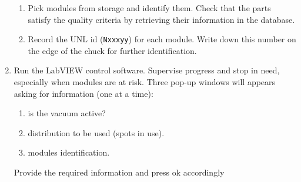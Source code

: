 \documentclass[12pt]{unlsilabsop}
\begin{document}
\begin{enumerate}
\begin{enumerate}
       \item Pick modules from storage and identify them. Check that the parts satisfy the quality criteria by retrieving their information in the database. \label{enum:startencapsulation}
    \item Record the UNL id (\texttt{Nxxxyy}) for each module. Write down this number on the edge of the chuck for further identification.
    \end{enumerate}
  \item Run the LabVIEW control software. Supervise progress and stop in need, especially when modules are at risk. Three pop-up windows will appears asking for information (one at a time):
    \begin{enumerate}
    \item is the vacuum active?
    \item distribution to be used (spots in use).  
    \item modules identification.  
    \end{enumerate}
    Provide the required information and press ok accordingly


\end{enumerate}
\end{document}
